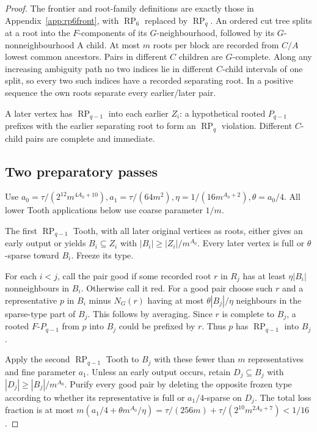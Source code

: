 \documentclass[11pt,a4paper]{article}
\theoremstyle{definition}
\theoremstyle{remark}
\numberwithin{equation}{section}
\DeclareMathOperator{\RP}{RP}
\begin{document}
\begin{proof}
The frontier and root-family definitions are exactly those in Appendix~\ref{app:rp6front}, with \(\operatorname{RP}_{6}\) replaced by \(\RP_{q}\). An ordered cut tree splits at a root into the \(F\)-components of its \(G\)-neighbourhood, followed by its \(G\)-nonneighbourhood A child. At most \(m\) roots per block are recorded from \(C/A\) lowest common ancestors. Pairs in different \(C\) children are \(G\)-complete. Along any increasing ambiguity path no two indices lie in different \(C\)-child intervals of one split, so every two such indices have a recorded separating root. In a positive sequence the own roots separate every earlier/later pair.

A later vertex has \(\RP_{q-1}\) into each earlier \(Z_{i}\): a hypothetical rooted \(P_{q-1}\) prefixes with the earlier separating root to form an \(\RP_{q}\) violation. Different \(C\)-child pairs are complete and immediate.
\subsection{Two preparatory passes}\label{subsec:rpq-preparatory}
Use \(a_{0}=\tau/(2^{12} m^{4A_{0}+10}),\allowbreak  a_{1}=\tau/(64m^{2}),\allowbreak  \eta=1/(16m^{A_{0}+2}),\allowbreak  \theta=a_{0}/4\). All lower Tooth applications below use coarse parameter \(1/m\).

The first \(\RP_{q-1}\) Tooth, with all later original vertices as roots, either gives an early output or yields \(B_{i}\subseteq Z_{i}\) with \(|B_{i}|\ge |Z_{i}|/m^{A_{0}}\). Every later vertex is full or \(\theta\)-sparse toward \(B_{i}\). Freeze its type.

For each \(i<j\), call the pair good if some recorded root \(r\) in \(R_{j}\) has at least \(\eta|B_{i}|\) nonneighbours in \(B_{i}\). Otherwise call it red. For a good pair choose such \(r\) and a representative \(p\) in \(B_{i}\) minus \(N_{G}(r)\) having at most \(\theta|B_{j}|/\eta\) neighbours in the sparse-type part of \(B_{j}\). This follows by averaging. Since \(r\) is complete to \(B_{j}\), a rooted \(F\text{-}P_{q-1}\) from \(p\) into \(B_{j}\) could be prefixed by \(r\). Thus \(p\) has \(\RP_{q-1}\) into \(B_{j}\).

Apply the second \(\RP_{q-1}\) Tooth to \(B_{j}\) with these fewer than \(m\) representatives and fine parameter \(a_{1}\). Unless an early output occurs, retain \(D_{j}\subseteq B_{j}\) with \(|D_{j}|\ge |B_{j}|/m^{A_{0}}\). Purify every good pair by deleting the opposite frozen type according to whether its representative is full or \(a_{1}/4\)-sparse on \(D_{j}\). The total loss fraction is at most \(m(a_{1}/4 + \theta m^{A_{0}}/\eta) =\tau/(256m) + \tau/(2^{10} m^{2A_{0}+7}) <1/16\).


\end{proof}
\end{document}
